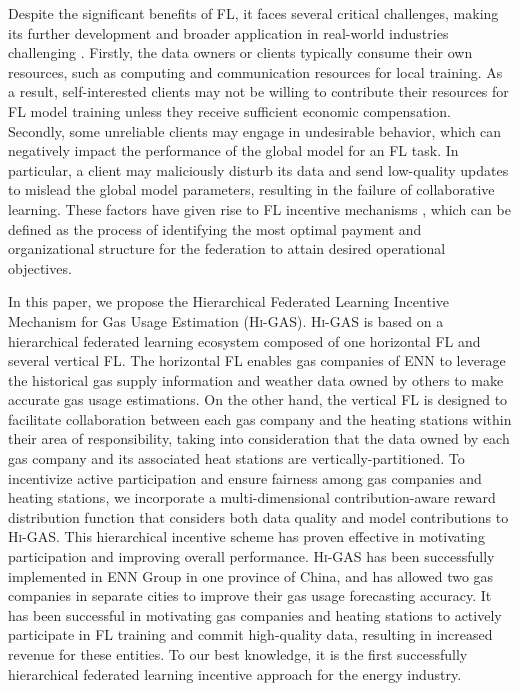 \documentclass{article}
\newcommand{\methodname}{\textsc{Hi-GAS}}
\begin{document}
Despite the significant benefits of FL, it faces several critical challenges, making its further development and broader application in real-world industries challenging \cite{zeng2021comprehensive,tu2022incentive}. Firstly, the data owners or clients typically consume their own resources, such as computing and communication resources for local training. As a result, self-interested clients may not be willing to contribute their resources for FL model training unless they receive sufficient economic compensation. Secondly, some unreliable clients may engage in undesirable behavior, which can negatively impact the performance of the global model for an FL task. In particular, a client may maliciously disturb its data and send low-quality updates to mislead the global model parameters, resulting in the failure of collaborative learning. These factors have given rise to FL incentive mechanisms \cite{khan2020federated,zhan2021survey}, which can be defined as the process of identifying the most optimal payment and organizational structure for the federation to attain desired operational objectives. 


In this paper, we propose the Hierarchical Federated Learning Incentive Mechanism for Gas Usage Estimation (\methodname{}). 
\methodname{} is based on a hierarchical federated learning ecosystem composed of one horizontal FL and several vertical FL. The horizontal FL enables gas companies of ENN to leverage the historical gas supply information and weather data owned by others to make accurate gas usage estimations. On the other hand, the vertical FL is designed to facilitate collaboration between each gas company and the heating stations within their area of responsibility, taking into consideration that the data owned by each gas company and its associated heat stations are vertically-partitioned.
To incentivize active participation and ensure fairness among gas companies and heating stations, we incorporate a multi-dimensional contribution-aware reward distribution function that considers both data quality and model contributions to \methodname{}. This hierarchical incentive scheme has proven effective in motivating participation and improving overall performance.
\methodname{} has been successfully implemented in ENN Group in one province of China, and has allowed two gas companies in separate cities to improve their gas usage forecasting accuracy. It has been successful in motivating gas companies and heating stations to actively participate in FL training and commit high-quality data, resulting in increased revenue for these entities. To our best knowledge, it is the first successfully hierarchical federated learning incentive approach for the energy industry.
\end{document}
